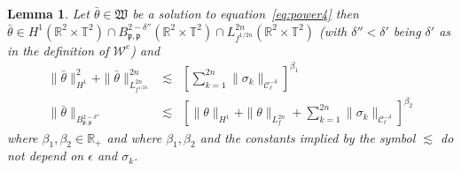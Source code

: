 \documentclass[a4paper,10pt]{article}
\newtheorem{lemma}{Lemma}
\begin{document}
\begin{lemma}
  \label{lemma_power1}Let $\bar{\theta} \in \mathfrak{W}$ be a solution to
  equation~{\eqref{eq:power4}} then $\bar{\theta} \in H^1 (\mathbb{R}^2 \times
  \mathbb{T}^2) \cap B^{2 - \delta''}_{\mathfrak{p}, \mathfrak{p}}
  (\mathbb{R}^2 \times \mathbb{T}^2) \cap L^{2 n}_{f^{1 / 2 n}} (\mathbb{R}^2
  \times \mathbb{T}^2)$ (with $\delta'' < \delta'$ being $\delta'$ as in the
  definition of $\mathcal{W}^e$) and
  \begin{eqnarray}
    \| \bar{\theta} \|_{H^1}^2 + \| \bar{\theta} \|_{L^{2 n}_{f^{1 / 2 n}}}^{2
    n} & \lesssim & \left[ \sum_{k = 1}^{2 n} \| \sigma_k \|_{\mathcal{C}^{-
    \delta}_{\ell}} \right]^{\beta_1} \label{eq:P1} \\
    \| \bar{\theta} \|_{B^{2 - \delta''}_{\mathfrak{p}, \mathfrak{p}}} &
    \lesssim & \left[ \| \theta \|_{H^1} + \| \theta \|_{L^{2 n}_f} + \sum_{k
    = 1}^{2 n} \| \sigma_k \|_{\mathcal{C}^{- \delta}_{\ell}}
    \right]^{\beta_2} \label{eq:P2} 
  \end{eqnarray}
  where $\beta_1, \beta_2 \in \mathbb{R}_+$ and where $\beta_1, \beta_2$ and
  the constants implied by the symbol $\lesssim$ do not depend on $\epsilon$
  and $\sigma_k$.
\end{lemma}
\end{document}
